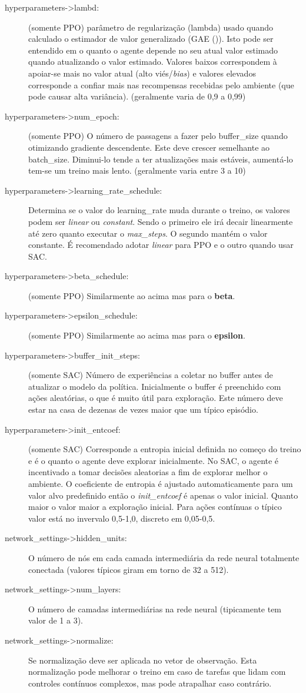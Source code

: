 \begin{description}
   \item [hyperparameters->lambd:] (somente PPO) parâmetro de regularização (lambda) usado quando calculado o estimador de valor generalizado (GAE ()). Isto pode ser entendido em o quanto o agente depende no seu atual valor estimado quando atualizando o valor estimado. Valores baixos correspondem à apoiar-se mais no valor atual (alto viés/\textit{bias}) e valores elevados corresponde a confiar mais nas recompensas recebidas pelo ambiente (que pode causar alta variância). (geralmente varia de 0,9 a 0,99)
   \item [hyperparameters->num\_epoch:] (somente PPO) O número de passagens a fazer pelo buffer\_size quando otimizando gradiente descendente. Este deve crescer semelhante ao batch\_size. Diminui-lo tende a ter atualizações mais estáveis, aumentá-lo tem-se um treino mais lento. (geralmente varia entre 3 a 10)
   \item [hyperparameters->learning\_rate\_schedule:] Determina se o valor do learning\_rate muda durante o treino, os valores podem ser \textit{linear} ou \textit{constant}. Sendo o primeiro ele irá decair linearmente até zero quanto executar o \textit{max\_steps}. O segundo mantém o valor constante. É recomendado adotar \textit{linear} para PPO e o outro quando usar SAC.
   \item [hyperparameters->beta\_schedule:] (somente PPO) Similarmente ao acima mas para o \textbf{beta}. 
   \item [hyperparameters->epsilon\_schedule:] (somente PPO) Similarmente ao acima mas para o \textbf{epsilon}. 
   \item [hyperparameters->buffer\_init\_steps:] (somente SAC) Número de experiências a coletar no buffer antes de atualizar o modelo da política. Inicialmente o buffer é preenchido com ações aleatórias, o que é muito útil para exploração. Este número deve estar na casa de dezenas de vezes maior que um típico episódio.
   \item [hyperparameters->init\_entcoef:] (somente SAC) Corresponde a entropia inicial definida no começo do treino e é o quanto o agente deve explorar inicialmente. No SAC, o agente é incentivado a tomar decisões aleatorias a fim de explorar melhor o ambiente. O coeficiente de entropia é ajustado automaticamente para um valor alvo predefinido então o \textit{init\_entcoef} é apenas o valor inicial. Quanto maior o valor maior a exploração inicial. Para ações contínuas o típico valor está no invervalo 0,5-1,0, discreto em 0,05-0,5.
   \item [network\_settings->hidden\_units:] O número de nós em cada camada intermediária da rede neural totalmente conectada (valores típicos giram em torno de 32 a 512).
   \item [network\_settings->num\_layers:] O número de camadas intermediárias na rede neural (tipicamente tem valor de 1 a 3).
   \item [network\_settings->normalize:] Se normalização deve ser aplicada no vetor de observação. Esta normalização pode melhorar o treino em caso de tarefas que lidam com controles contínuos complexos, mas pode atrapalhar caso contrário.
\end{description}

